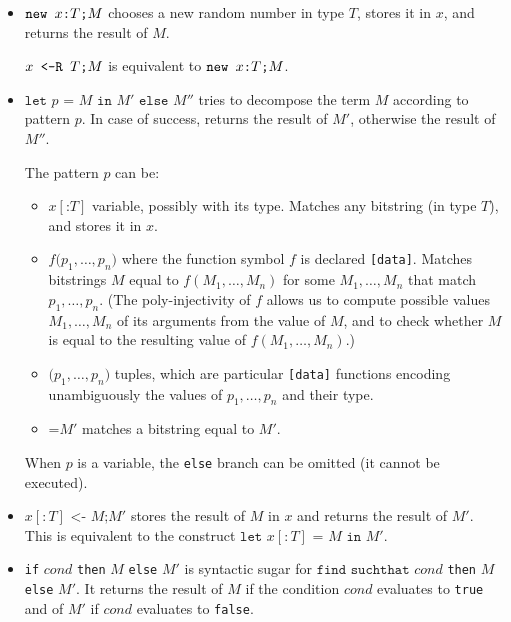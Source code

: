 \begin{itemize}

\item $\texttt{new\ }{x}\texttt{:}{T}\texttt{;}M$ chooses a new
random number in type $T$, stores it in $x$, and returns the result 
of $M$.

${x}\texttt{ <-R }{T}\texttt{;}M$ is equivalent to $\texttt{new\ }{x}\texttt{:}{T}\texttt{;}M$.

\item $\texttt{let }p \texttt{ = }M\texttt{ in }M'\texttt{ else }M''$
tries to decompose the term $M$ according to pattern $p$.
In case of success, returns the result of $M'$, otherwise 
the result of $M''$. 

The pattern $p$ can be:
\begin{itemize}

\item $x[\texttt{:}T]$ variable, possibly with its type. Matches any bitstring
(in type $T$), and stores it in $x$.

\item $f\texttt{(}p_1, \ldots, p_n\texttt{)}$ 
where the function symbol $f$ is declared 
\texttt{[data]}. Matches bitstrings $M$ equal to $f(M_1, \ldots, M_n)$
for some $M_1, \ldots, M_n$ that match $p_1, \ldots, p_n$.
(The poly-injectivity of $f$ allows us to compute possible
values $M_1, \ldots, M_n$ of its arguments from the value of $M$, and to check
whether $M$ is equal to the resulting value of $f(M_1, \ldots, M_n)$.) 

\item $\texttt{(}p_1, \ldots, p_n\texttt{)}$ tuples, which are particular \texttt{[data]}
functions encoding unambiguously the values of $p_1, \ldots, p_n$
and their type.

\item $\texttt{=}M'$ matches a bitstring equal to $M'$.

\end{itemize}
When $p$ is a variable, the \texttt{else}
branch can be omitted (it cannot be executed).

\item $x[:T] \texttt{ <- }M\texttt{;}M'$
stores the result of $M$  in $x$
and returns the result of $M'$. This is equivalent
to the construct 
$\texttt{let }x[:T] \texttt{ = }M\texttt{ in }M'$.

\item \texttt{if} $\mathit{cond}$ \texttt{then} $M$ \texttt{else} $M'$ is 
syntactic sugar for $\texttt{find suchthat }\mathit{cond}$ \texttt{then} $M$ \texttt{else} $M'$.
It returns the result of $M$ if the condition $\mathit{cond}$ evaluates to \texttt{true} and of $M'$ if $\mathit{cond}$ evaluates to \texttt{false}.


\end{itemize}
